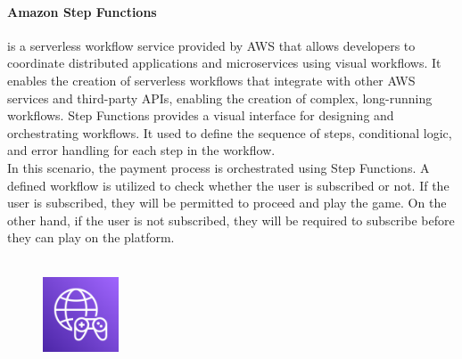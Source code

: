 \documentclass[a4paper,12pt]{report}
\begin{document}
\paragraph{Amazon Step Functions}  is a serverless workflow service provided by AWS that allows developers to coordinate distributed applications and microservices using visual workflows. It enables the creation of serverless workflows that integrate with other AWS services and third-party APIs, enabling the creation of complex, long-running workflows.
Step Functions provides a visual interface for designing and orchestrating workflows. It used to define the sequence of steps, conditional logic, and error handling for each step in the workflow. \\
In this scenario, the payment process is orchestrated using Step Functions. A defined workflow is utilized to check whether the user is subscribed or not. If the user is subscribed, they will be permitted to proceed and play the game. On the other hand, if the user is not subscribed, they will be required to subscribe before they can play on the platform.\\\\
%
%
\begin{figure}
  \centering
  \includegraphics[width=0.2\textwidth]{img/services/GameLift}
\end{figure}
%
\end{document}
